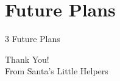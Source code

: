 \documentclass[aspectratio=1610]{beamer}
\begin{document}
\section{Future Plans}

\begin{frame}{3 Future Plans}

\begin{center} \Huge Thank You! \\ \normalsize From Santa's Little Helpers\end{center} 
\end{frame}
\end{document}
